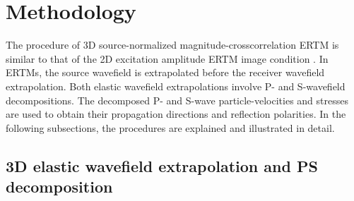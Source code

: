 \documentclass[manuscript,ulem,graphix,revised]{geophysics}
\begin{document}
\section{Methodology}

The procedure of 3D source-normalized magnitude-crosscorrelation ERTM is similar to that of the 2D excitation amplitude ERTM image condition \citep{wenlong_vct15}. In ERTMs, the source wavefield is extrapolated before the receiver wavefield extrapolation. Both elastic wavefield extrapolations involve P- and S-wavefield decompositions. The decomposed P- and S-wave particle-velocities and stresses are used to obtain their propagation directions and reflection polarities. 
In the following subsections, the procedures are explained and illustrated in detail.

\subsection{3D elastic wavefield extrapolation and PS decomposition}
\end{document}

